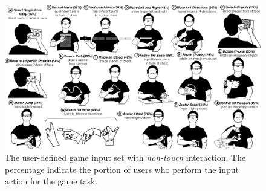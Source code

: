 \documentclass{sigchi}
\begin{document}
  \begin{figure}
  \centering
  \includegraphics[width=1\textwidth]{InAirSet.pdf}
  \caption{The user-defined game input set with \emph{non-touch} interaction, The percentage indicate the portion of users who perform the input action for the game task.}
  \label{fig:InAirSet}
  \end{figure}
\end{document}

